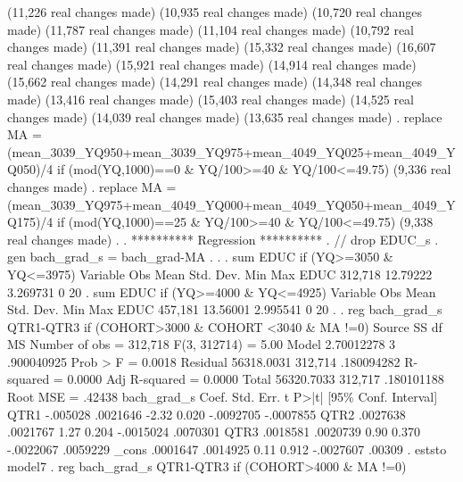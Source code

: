 (11,226 real changes made)
(10,935 real changes made)
(10,720 real changes made)
(11,787 real changes made)
(11,104 real changes made)
(10,792 real changes made)
(11,391 real changes made)
(15,332 real changes made)
(16,607 real changes made)
(15,921 real changes made)
(14,914 real changes made)
(15,662 real changes made)
(14,291 real changes made)
(14,348 real changes made)
(13,416 real changes made)
(15,403 real changes made)
(14,525 real changes made)
(14,039 real changes made)
(13,635 real changes made)
{\smallskip}
. replace MA = (mean_3039_YQ950+mean_3039_YQ975+mean_4049_YQ025+mean_4049_YQ050)/4 if (mod(YQ,1000)==0 \& YQ/100>=40 \& YQ/100<=49.75)
(9,336 real changes made)
{\smallskip}
. replace MA = (mean_3039_YQ975+mean_4049_YQ000+mean_4049_YQ050+mean_4049_YQ175)/4 if (mod(YQ,1000)==25 \& YQ/100>=40 \& YQ/100<=49.75)
(9,338 real changes made)
{\smallskip}
. 
. **********  Regression **********
. // drop EDUC_s
. gen bach_grad_s = bach_grad-MA
{\smallskip}
. 
. 
. sum EDUC if (YQ>=3050 \& YQ<=3975)
{\smallskip}
    Variable {\VBAR}        Obs        Mean    Std. Dev.       Min        Max
        EDUC {\VBAR}    312,718    12.79222    3.269731          0         20
{\smallskip}
. sum EDUC if (YQ>=4000 \& YQ<=4925)
{\smallskip}
    Variable {\VBAR}        Obs        Mean    Std. Dev.       Min        Max
        EDUC {\VBAR}    457,181    13.56001    2.995541          0         20
{\smallskip}
. 
. reg bach_grad_s QTR1-QTR3  if (COHORT>3000 \& COHORT <3040 \& MA !=0)
{\smallskip}
      Source {\VBAR}       SS           df       MS      Number of obs   =   312,718
   F(3, 312714)    =      5.00
       Model {\VBAR}  2.70012278         3  .900040925   Prob > F        =    0.0018
    Residual {\VBAR}  56318.0031   312,714  .180094282   R-squared       =    0.0000
   Adj R-squared   =    0.0000
       Total {\VBAR}  56320.7033   312,717  .180101188   Root MSE        =    .42438
{\smallskip}
 bach_grad_s {\VBAR}      Coef.   Std. Err.      t    P>|t|     [95\% Conf. Interval]
        QTR1 {\VBAR}   -.005028   .0021646    -2.32   0.020    -.0092705   -.0007855
        QTR2 {\VBAR}   .0027638   .0021767     1.27   0.204    -.0015024    .0070301
        QTR3 {\VBAR}   .0018581   .0020739     0.90   0.370    -.0022067    .0059229
       _cons {\VBAR}   .0001647   .0014925     0.11   0.912    -.0027607      .00309
{\smallskip}
. eststo model7
{\smallskip}
. reg bach_grad_s QTR1-QTR3  if (COHORT>4000 \& MA !=0)
